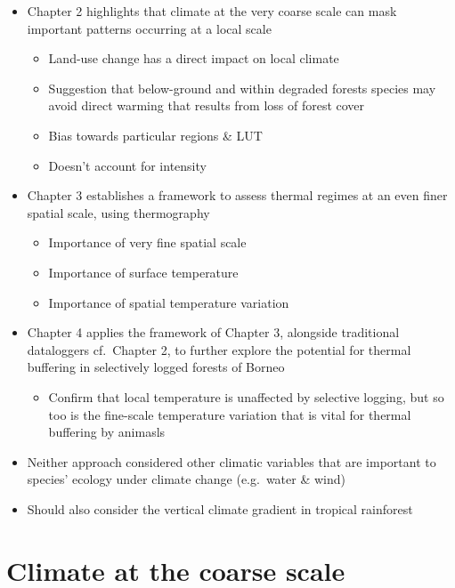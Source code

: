 \documentclass[12pt,a4paper,]{report}
\providecommand{\tightlist}{%
  \setlength{\itemsep}{0pt}\setlength{\parskip}{0pt}}
\theoremstyle{definition}
\theoremstyle{definition}
\theoremstyle{definition}
\theoremstyle{remark}
\begin{document}
\begin{itemize}
\tightlist
\item
  Chapter 2 highlights that climate at the very coarse scale can mask
  important patterns occurring at a local scale

  \begin{itemize}
  \tightlist
  \item
    Land-use change has a direct impact on local climate
  \item
    Suggestion that below-ground and within degraded forests species may
    avoid direct warming that results from loss of forest cover
  \item
    Bias towards particular regions \& LUT
  \item
    Doesn't account for intensity
  \end{itemize}
\item
  Chapter 3 establishes a framework to assess thermal regimes at an even
  finer spatial scale, using thermography

  \begin{itemize}
  \tightlist
  \item
    Importance of very fine spatial scale
  \item
    Importance of surface temperature
  \item
    Importance of spatial temperature variation
  \end{itemize}
\item
  Chapter 4 applies the framework of Chapter 3, alongside traditional
  dataloggers cf.~Chapter 2, to further explore the potential for
  thermal buffering in selectively logged forests of Borneo

  \begin{itemize}
  \tightlist
  \item
    Confirm that local temperature is unaffected by selective logging,
    but so too is the fine-scale temperature variation that is vital for
    thermal buffering by animasls
  \end{itemize}
\item
  Neither approach considered other climatic variables that are
  important to species' ecology under climate change (e.g.~water \&
  wind)
\item
  Should also consider the vertical climate gradient in tropical
  rainforest \citep{scheffers_tropical_2018, scheffers_vertical_2017}
\end{itemize}

\section{Climate at the coarse scale}\label{climate-at-the-coarse-scale}
\end{document}
